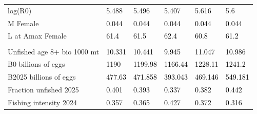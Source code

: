 \documentclass[
]{scrartcl}
\begin{document}
\begin{landscape}
\begin{longtable}[t]{ll>{\raggedright\arraybackslash}p{5em}>{\raggedright\arraybackslash}p{5em}>{\raggedright\arraybackslash}p{5em}>{\raggedright\arraybackslash}p{5em}}
\hspace{1em}log(R0) & \textcolor{black}{5.488} & \textcolor{black}{5.496} & \textcolor{black}{5.407} & \textcolor{black}{5.616} & \textcolor{black}{5.6}\\
\hspace{1em}M Female & \textcolor{black}{0.044} & \textcolor{black}{0.044} & \textcolor{black}{0.044} & \textcolor{black}{0.044} & \textcolor{black}{0.044}\\
\hspace{1em}L at Amax Female & \textcolor{black}{61.4} & \textcolor{black}{61.5} & \textcolor{black}{62.4} & \textcolor{black}{60.8} & \textcolor{black}{61.2}\\
\addlinespace[0.3em]
\multicolumn{6}{l}{\textbf{Estimates of derived quantities}}\\
\hspace{1em}Unfished age 8+ bio 1000 mt & \textcolor{black}{10.331} & \textcolor{black}{10.441} & \textcolor{black}{9.945} & \textcolor{black}{11.047} & \textcolor{black}{10.986}\\
\hspace{1em}B0 billions of eggs & \textcolor{black}{1190} & \textcolor{black}{1199.98} & \textcolor{black}{1166.44} & \textcolor{black}{1228.11} & \textcolor{black}{1241.2}\\
\hspace{1em}B2025 billions of eggs & \textcolor{black}{477.63} & \textcolor{black}{471.858} & \textcolor{black}{393.043} & \textcolor{black}{469.146} & \textcolor{black}{549.181}\\
\hspace{1em}Fraction unfished 2025 & \textcolor{black}{0.401} & \textcolor{black}{0.393} & \textcolor{black}{0.337} & \textcolor{black}{0.382} & \textcolor{black}{0.442}\\
\hspace{1em}Fishing intensity 2024 & \textcolor{black}{0.357} & \textcolor{black}{0.365} & \textcolor{black}{0.427} & \textcolor{black}{0.372} & \textcolor{black}{0.316}\\
\bottomrule

\end{longtable}

\endgroup{}


\end{landscape}

\newpage{}

\begingroup\fontsize{8}{10}\selectfont
\end{document}
